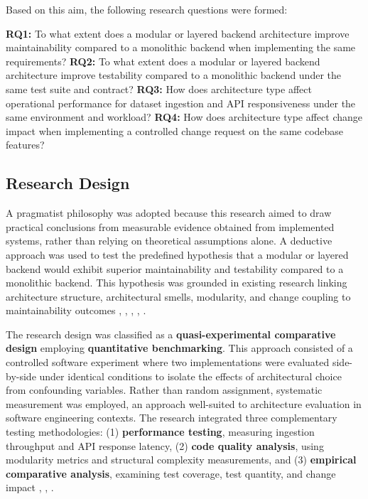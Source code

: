 \documentclass[conference]{IEEEtran}
\begin{document}
Based on this aim, the following research questions were formed:

\hfill \break
\textbf{RQ1:} To what extent does a modular or layered backend architecture improve maintainability compared to a monolithic backend when implementing the same requirements?
\hfill \break
\textbf{RQ2:} To what extent does a modular or layered backend architecture improve testability compared to a monolithic backend under the same test suite and contract?
\hfill \break
\textbf{RQ3:} How does architecture type affect operational performance for dataset ingestion and API responsiveness under the same environment and workload?
\hfill \break
\textbf{RQ4:} How does architecture type affect change impact when implementing a controlled change request on the same codebase features?

\subsection{Research Design}
A pragmatist philosophy was adopted because this research aimed to draw practical conclusions from measurable evidence obtained from implemented systems, rather than relying on theoretical assumptions alone. A deductive approach was used to test the predefined hypothesis that a modular or layered backend would exhibit superior maintainability and testability compared to a monolithic backend. This hypothesis was grounded in existing research linking architecture structure, architectural smells, modularity, and change coupling to maintainability outcomes \cite{b1}, \cite{b3}, \cite{b4}, \cite{b6}, \cite{b7}. 

The research design was classified as a \textbf{quasi-experimental comparative design} employing \textbf{quantitative benchmarking}. This approach consisted of a controlled software experiment where two implementations were evaluated side-by-side under identical conditions to isolate the effects of architectural choice from confounding variables. Rather than random assignment, systematic measurement was employed, an approach well-suited to architecture evaluation in software engineering contexts. The research integrated three complementary testing methodologies: (1) \textbf{performance testing}, measuring ingestion throughput and API response latency, (2) \textbf{code quality analysis}, using modularity metrics and structural complexity measurements, and (3) \textbf{empirical comparative analysis}, examining test coverage, test quantity, and change impact \cite{b4}, \cite{b6}, \cite{b7}. 
\end{document}
